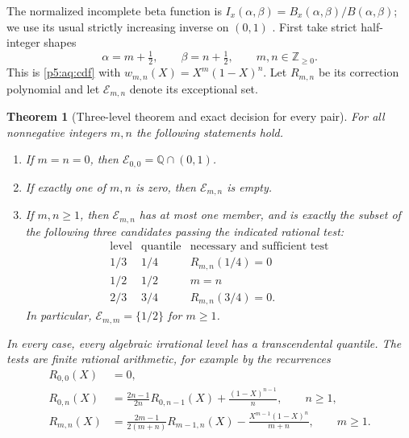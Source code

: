 \documentclass[11pt,a4paper]{article}
\newtheorem{theorem}{Theorem}[section]
\theoremstyle{definition}
\theoremstyle{remark}
\numberwithin{equation}{section}
\begin{document}
The normalized incomplete beta function is
$I_x(\alpha,\beta)=B_x(\alpha,\beta)/B(\alpha,\beta)$;
we use its usual strictly increasing inverse on $(0,1)$
\cite{p6:DLMF}. First take strict half-integer shapes
\[
 \alpha=m+\tfrac12,\qquad\beta=n+\tfrac12,
 \qquad m,n\in\mathbb Z_{\ge0}.
\]
This is \eqref{p5:aq:cdf} with $w_{m,n}(X)=X^m(1-X)^n$.
Let $R_{m,n}$ be its correction polynomial and let
$\mathcal E_{m,n}$ denote its exceptional set.

\begin{theorem}[Three-level theorem and exact decision for every pair]
\label{p5:aq:beta}
For all nonnegative integers $m,n$ the following statements hold.
\begin{enumerate}
\item If $m=n=0$, then
      $\mathcal E_{0,0}=\mathbb Q\cap(0,1)$.
\item If exactly one of $m,n$ is zero, then
      $\mathcal E_{m,n}$ is empty.
\item If $m,n\ge1$, then $\mathcal E_{m,n}$ has at most one
      member, and is exactly the subset of the following three
      candidates passing the indicated rational test:
      \[
      \begin{array}{c|c|c}
       \text{level}&\text{quantile}&\text{necessary and sufficient test}\\ \hline
       1/3&1/4&R_{m,n}(1/4)=0\\
       1/2&1/2&m=n\\
       2/3&3/4&R_{m,n}(3/4)=0.
      \end{array}
      \]
      In particular, $\mathcal E_{m,m}=\{1/2\}$ for $m\ge1$.
\end{enumerate}
In every case, every algebraic irrational level has a
transcendental quantile.
The tests are finite rational arithmetic, for example by the
recurrences
\begin{align}
 R_{0,0}(X)&=0,\nonumber\\
 R_{0,n}(X)&=\frac{2n-1}{2n}R_{0,n-1}(X)
                  +\frac{(1-X)^{n-1}}n,\qquad n\ge1,
        \label{p5:aq:beta-recurrence}\\
 R_{m,n}(X)&=\frac{2m-1}{2(m+n)}R_{m-1,n}(X)
       -\frac{X^{m-1}(1-X)^n}{m+n},\qquad m\ge1. \nonumber
\end{align}
\end{theorem}
\end{document}

